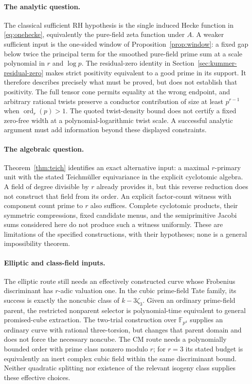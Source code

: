 \documentclass[11pt]{article}
\theoremstyle{definition}
\theoremstyle{remark}
\begin{document}
\paragraph{The analytic question.}
The classical sufficient RH hypothesis is the single induced Hecke function in \eqref{eq:onehecke}, equivalently the pure-field zeta function under $A$. A weaker sufficient input is the one-sided window of Proposition~\ref{prop:window}: a fixed gap below twice the principal term for the smoothed pure-field prime sum at a scale polynomial in $r$ and $\log p$. The residual-zero identity in Section~\ref{sec:kummer-residual-zero} makes strict positivity equivalent to a good prime in its support. It therefore describes precisely what must be proved, but does not establish that positivity. The full tensor cone permits equality at the wrong endpoint, and arbitrary rational twists preserve a conductor contribution of size at least $p^{r-1}$ when $\operatorname{ord}_r(p)>1$. The quoted twist-density bound does not certify a fixed zero-free width at a polynomial-logarithmic twist scale. A successful analytic argument must add information beyond these displayed constraints.

\paragraph{The algebraic question.}
Theorem~\ref{thm:teich} identifies an exact alternative input: a maximal $r$-primary unit with the stated Teichm\"uller equivariance in the explicit cyclotomic algebra. A field of degree divisible by $r$ already provides it, but this reverse reduction does not construct that field from its order. An explicit factor-count witness with component count prime to $r$ also suffices. Complete cyclotomic products, their symmetric compressions, fixed candidate menus, and the semiprimitive Jacobi sums considered here do not produce such a witness uniformly. These are limitations of the specified constructions, with their hypotheses; none is a general impossibility theorem.

\paragraph{Elliptic and class-field inputs.}
The elliptic route still needs an effectively constructed curve whose Frobenius discriminant has $r$-adic valuation one. In the cubic prime-field Tate family, its success is exactly the noncubic class of $k-3\zeta_3$. Given an ordinary prime-field parent, the restricted nonparent selector is polynomial-time equivalent to general promised-cube extraction. The two-trial construction over $\mathbb F_{p^4}$ supplies an ordinary curve with rational three-torsion, but changes that parent domain and does not force the necessary noncube. The CM route needs a polynomially bounded order with prime class nonzero modulo $r$; for $r=3$ its stated budget is equivalently an inert complex cubic field within the same discriminant bound. Neither quadratic splitting nor existence of the relevant isogeny class supplies these effective choices.
\end{document}
